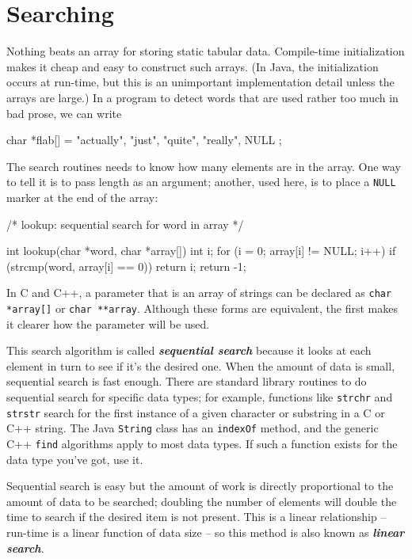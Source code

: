 \section{Searching}
Nothing beats an array for storing static tabular data. Compile-time
initialization makes it cheap and easy to construct such arrays. (In Java,
the initialization occurs at run-time, but this is an unimportant
implementation detail unless the arrays are large.) In a program to detect
words that are used rather too much in bad prose, we can write
\begin{wellcode}

    char *flab[] = {
        "actually",
        "just",
        "quite",
        "really",
        NULL
    };
\end{wellcode}
The search routines needs to know how many elements are in the array. One way to tell it is to pass length as an argument; another, used here, is to place a \verb'NULL' marker at the end of the array:
\begin{wellcode}
    /* lookup: sequential search for word in array */

    int lookup(char *word, char *array[])
    {
        int i;
        for (i = 0; array[i] != NULL; i++)
           if (strcmp(word, array[i] == 0))
                return i;
        return -1;
    }
\end{wellcode}
In C and C++, a parameter that is an array of strings can be declared as
\verb"char *array[]" or \verb"char **array". Although these forms are
equivalent, the first makes it clearer how the parameter will be used.

This search algorithm is called \textbf{\textit{sequential search}} because
it looks at each element in turn to see if it's the desired one. When the
amount of data is small, sequential search is fast enough. There are
standard library routines to do sequential search for specific data types;
for example, functions like \texttt{strchr} and \texttt{strstr} search for
the first instance of a given character or substring in a C or C++ string.
The Java \verb'String' class has an \verb'indexOf' method, and the generic
C++ \verb'find' algorithms apply to most data types. If such a function
exists for the data type you've got, use it.

Sequential search is easy but the amount of work is directly proportional
to the amount of data to be searched; doubling the number of elements will
double the time to search if the desired item is not present. This is a
linear relationship -- run-time is a linear function of data size -- so
this method is also known as \textbf{\textit{linear search}}.


